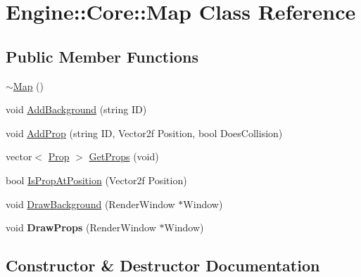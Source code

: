 \hypertarget{class_engine_1_1_core_1_1_map}{}\section{Engine\+:\+:Core\+:\+:Map Class Reference}
\label{class_engine_1_1_core_1_1_map}
\subsection*{Public Member Functions}
\begin{DoxyCompactItemize}
\item 
\hyperlink{class_engine_1_1_core_1_1_map_a211f38a71b97179bbbd153442225a273}{$\sim$\+Map} ()
\item 
void \hyperlink{class_engine_1_1_core_1_1_map_aa81a28822b49c3c7750f0444a189ed8c}{Add\+Background} (string ID)
\item 
void \hyperlink{class_engine_1_1_core_1_1_map_a7aa7b53aadcd106a169eb19435bba5ab}{Add\+Prop} (string ID, Vector2f Position, bool Does\+Collision)
\item 
vector$<$ \hyperlink{namespace_engine_1_1_core_aa19279815c8e1c96d68332fcaa7d59d8}{Prop} $>$ \hyperlink{class_engine_1_1_core_1_1_map_a6e78069a9f1911a3ade60f38d4783563}{Get\+Props} (void)
\item 
bool \hyperlink{class_engine_1_1_core_1_1_map_a5d17ba161757b4b971dba919e7e0b1c1}{Is\+Prop\+At\+Position} (Vector2f Position)
\item 
void \hyperlink{class_engine_1_1_core_1_1_map_aea4443f092aabf355e2427fa27605d4d}{Draw\+Background} (Render\+Window $\ast$Window)
\item 
\mbox{\label{class_engine_1_1_core_1_1_map_a1d24a07606dca61d86decc02eb9691d8}} 
void {\bfseries Draw\+Props} (Render\+Window $\ast$Window)
\end{DoxyCompactItemize}


\subsection{Constructor \& Destructor Documentation}
\mbox{\label{class_engine_1_1_core_1_1_map_a211f38a71b97179bbbd153442225a273}} 

